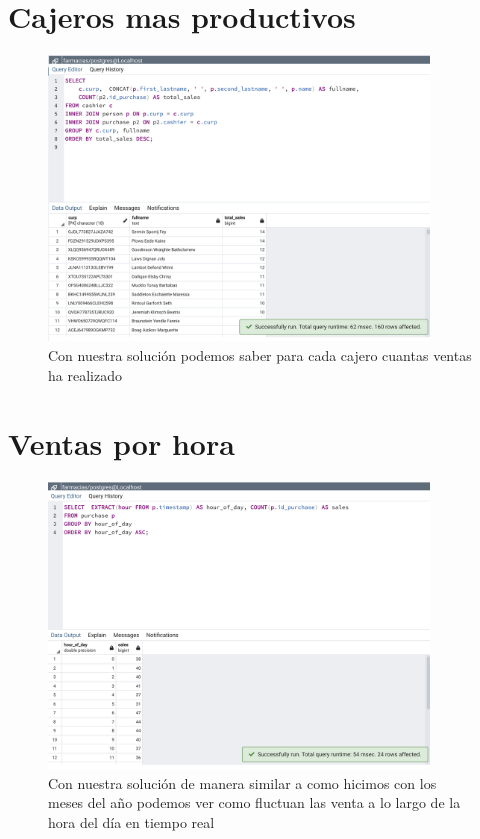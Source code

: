 \documentclass[12pt, fleqn]{report}                             %
\theoremstyle{break}                                            %
\begin{document}
        \clearpage
        \section{Cajeros mas productivos}
            
            \begin{figure}[ht]
                \includegraphics[width=0.9\textwidth]{8}
                \caption{Con nuestra solución podemos saber para cada cajero cuantas ventas ha realizado}
            \end{figure}

        \clearpage
        \section{Ventas por hora}
            
            \begin{figure}[ht]
                \includegraphics[width=0.9\textwidth]{9}
                \caption{Con nuestra solución de manera similar a como hicimos con los meses del año podemos
                ver como fluctuan las venta a lo largo de la hora del día en tiempo real}
            \end{figure}
\end{document}

